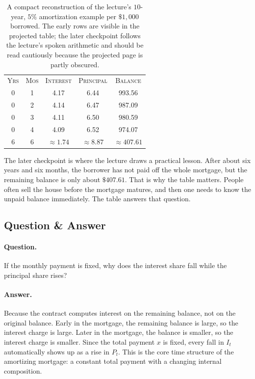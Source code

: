 \begin{table}[htbp]
\centering
\begin{tabular}{ccccc}
\textsc{Yrs} & \textsc{Mos} & \textsc{Interest} & \textsc{Principal} & \textsc{Balance} \\
0 & 1 & 4.17 & 6.44 & 993.56 \\
0 & 2 & 4.14 & 6.47 & 987.09 \\
0 & 3 & 4.11 & 6.50 & 980.59 \\
0 & 4 & 4.09 & 6.52 & 974.07 \\
6 & 6 & \(\approx 1.74\) & \(\approx 8.87\) & \(\approx 407.61\)
\end{tabular}
\caption{A compact reconstruction of the lecture's \(10\)-year, \(5\%\) amortization example per \(\$1{,}000\) borrowed. The early rows are visible in the projected table; the later checkpoint follows the lecture's spoken arithmetic and should be read cautiously because the projected page is partly obscured.}
\end{table}

The later checkpoint is where the lecture draws a practical lesson. After about six years and six months, the borrower has not paid off the whole mortgage, but the remaining balance is only about \(\$407.61\). That is why the table matters. People often sell the house before the mortgage matures, and then one needs to know the unpaid balance immediately. The table answers that question.

\subsection{Question \& Answer}

\paragraph{Question.} If the monthly payment is fixed, why does the interest share fall while the principal share rises?

\paragraph{Answer.} Because the contract computes interest on the remaining balance, not on the original balance. Early in the mortgage, the remaining balance is large, so the interest charge is large. Later in the mortgage, the balance is smaller, so the interest charge is smaller. Since the total payment \(x\) is fixed, every fall in \(I_t\) automatically shows up as a rise in \(P_t\). This is the core time structure of the amortizing mortgage: a constant total payment with a changing internal composition.

